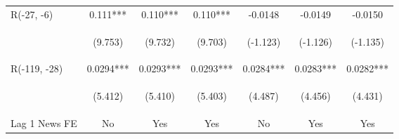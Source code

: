 \documentclass[border=0.2cm]{standalone}
\begin{document}
\begin{tabular}{lcccccc}
    R(-27, -6)        & 0.111***                                       & 0.110***                                       & 0.110***                                       & -0.0148                                        & -0.0149                                        & -0.0150                                        \\
    \vspace{4pt}      & \begin{footnotesize}(9.753)\end{footnotesize}  & \begin{footnotesize}(9.732)\end{footnotesize}  & \begin{footnotesize}(9.703)\end{footnotesize}  & \begin{footnotesize}(-1.123)\end{footnotesize} & \begin{footnotesize}(-1.126)\end{footnotesize} & \begin{footnotesize}(-1.135)\end{footnotesize} \\
    R(-119, -28)      & 0.0294***                                      & 0.0293***                                      & 0.0293***                                      & 0.0284***                                      & 0.0283***                                      & 0.0282***                                      \\
    \vspace{4pt}      & \begin{footnotesize}(5.412)\end{footnotesize}  & \begin{footnotesize}(5.410)\end{footnotesize}  & \begin{footnotesize}(5.403)\end{footnotesize}  & \begin{footnotesize}(4.487)\end{footnotesize}  & \begin{footnotesize}(4.456)\end{footnotesize}  & \begin{footnotesize}(4.431)\end{footnotesize}  \\
    Lag 1 News FE     & No                                             & Yes                                            & Yes                                            & No                                             & Yes                                            & Yes                                            \\

\end{tabular}
\end{document}
